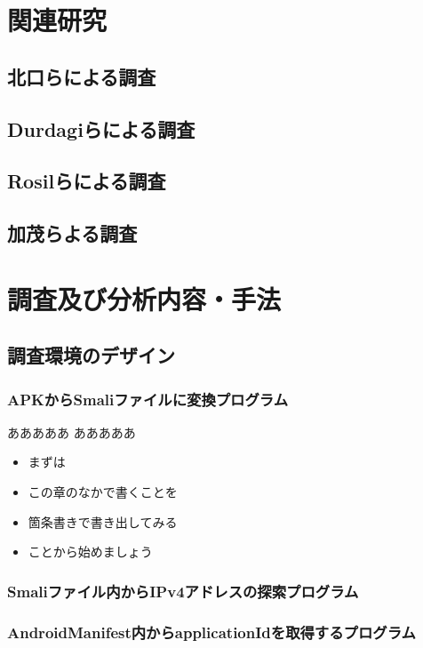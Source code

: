 \documentclass[a4j]{jarticle}
\begin{document}
\newpage
\section{関連研究} %
\subsection{北口らによる調査}

\subsection{Durdagiらによる調査}

\subsection{Rosilらによる調査}

\subsection{加茂らよる調査}


\newpage
\section{調査及び分析内容・手法}
\subsection{調査環境のデザイン}
\subsubsection{APKからSmaliファイルに変換プログラム}
あああああ
あああああ
\begin{itemize}
\item まずは
\item この章のなかで書くことを
\item 箇条書きで書き出してみる
\item ことから始めましょう
\end{itemize}
\subsubsection{Smaliファイル内からIPv4アドレスの探索プログラム}
\subsubsection{AndroidManifest内からapplicationIdを取得するプログラム}
\end{document}
